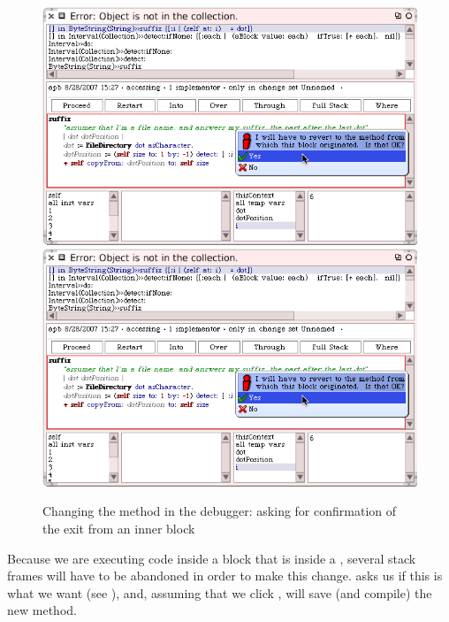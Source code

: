 \documentclass[a4paper,10pt,twoside]{book}
\begin{document}
\begin{figure}[btp]
	\begin{center}
	\ifluluelse
		{\includegraphics[width=\textwidth]{revertDialog}}
		{\includegraphics[scale=0.7]{revertDialog}}
	\end{center}
	\caption{Changing the  method in the debugger: asking for confirmation of the exit from an inner block}
	\label{fig:revertDialog}
\end{figure}

Because we are executing code inside a block that is inside a , several stack frames will have to be abandoned in order to make this change.  \sq asks us if this is what we want (see ), and, assuming that we click , will save (and compile) the new method.
\end{document}
